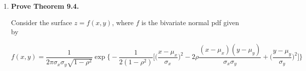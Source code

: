 \documentclass[10pt, oneside]{article}
\begin{document}
\begin{enumerate}[label=9.\arabic*]
\begin{proof}
Now, the inner bracketed term of the argument of the exponential function can be rewritten as

\begin{align*}
\frac{(x-\mu_x)^2}{\sigma^2_x}  - 2\rho \frac{(x-\mu_x)(y-\mu_y)}{\sigma_x \sigma_y} + \rho^2 \frac{(y - \mu_y)^2}{\sigma^2_y} &= \frac{ (x-\mu_x)^2  - \frac{ 2\rho \sigma_x (x-\mu_x)(y-\mu_y)}{\sigma_y} + \frac{ \rho^2 \sigma^2_x (y - \mu_y)^2}{\sigma^2_y} }{ \sigma^2_x } \\
&= \frac{ \big[ (x-\mu_x) - \rho \frac{\sigma_x}{\sigma_y} (y - \mu_y) \big]^2 }{\sigma^2_x} \\
&= \frac{ \big[ x- (\mu_x + \rho \frac{\sigma_x}{\sigma_y} (y - \mu_y) ) \big]^2 }{\sigma^2_x} 
\end{align*}

Therefore we conclude with

\[ \boxed{ g(x|y) = \frac{1}{\sqrt{2\pi} \sigma_x \sqrt{1-\rho^2}} \exp \bigg\{ -\frac{1}{2} \frac{[x-(\mu_x + \rho \frac{\sigma_x}{\sigma_y} (y-\mu_y))]^2}{\sigma^2_x (1-\rho^2)} \bigg\}, \quad -\infty < x,y < +\infty } \]

which has distribution $\boxed{ N\bigg[ \mu_x + \rho \frac{\sigma_x}{\sigma_y} (y-\mu_y), \sigma^2_x (1-\rho^2) \bigg] }$. Simply switch $x$ for $y$ to get

\[ \boxed{ h(y|x) = \frac{1}{\sqrt{2\pi} \sigma_y \sqrt{1-\rho^2}} \exp \bigg\{ -\frac{1}{2} \frac{[y-(\mu_y + \rho \frac{\sigma_y}{\sigma_x} (x-\mu_x))]^2}{\sigma^2_y (1-\rho^2)} \bigg\}, \quad -\infty < x,y < +\infty } \]

which has distribution $\boxed{ N\bigg[ \mu_y + \rho \frac{\sigma_y}{\sigma_x} (x-\mu_x), \sigma^2_y (1-\rho^2) \bigg] }$.

\end{proof}

\item  \begin{tcolorbox}[
  colback=Cerulean!5!white,
  colframe=Cerulean!75!black]
\textbf{Prove Theorem 9.4.}
\end{tcolorbox}

\begin{thm}
Consider the surface $z = f(x,y)$, where $f$ is the bivariate normal pdf given by

\[ f(x,y) = \frac{1}{2\pi \sigma_x \sigma_y \sqrt{1-\rho^2}} \exp \bigg\{ -\frac{1}{2(1-\rho^2)} \bigg[ \bigg( \frac{x - \mu_x}{\sigma_x} \bigg)^2 - 2\rho \frac{(x - \mu_x)(y - \mu_y)}{\sigma_x \sigma_y} + \bigg( \frac{y - \mu_y}{\sigma_y} \bigg)^2 \bigg] \bigg\}  \]


\end{thm}
\end{enumerate}
\end{document}
